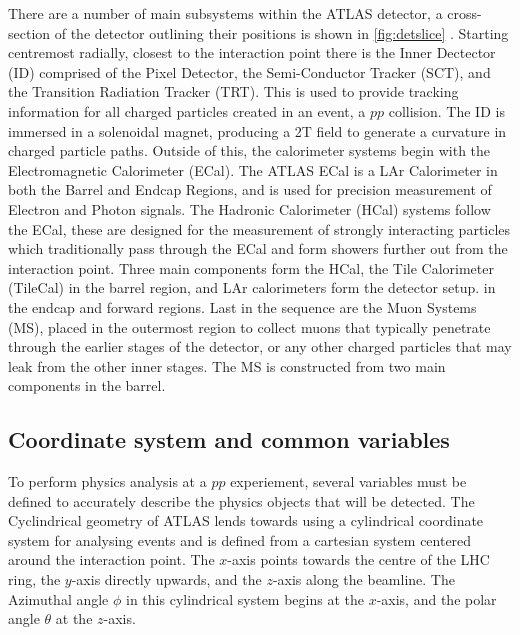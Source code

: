 There are a number of main subsystems within the ATLAS detector, a cross-section of the detector outlining their positions is shown in \ref{fig:detslice} . Starting centremost radially, closest to the interaction point there is the Inner Dectector (ID) comprised of the Pixel Detector, the Semi-Conductor Tracker (SCT), and the Transition Radiation Tracker (TRT). This is used to provide tracking information for all charged particles created in an event, a $pp$ collision. The ID is immersed in a solenoidal magnet, producing a 2T field to generate a curvature in charged particle paths. Outside of this, the calorimeter systems begin with the Electromagnetic Calorimeter (ECal). The ATLAS ECal is a LAr Calorimeter in both the Barrel and Endcap Regions, and is used for precision measurement of Electron and Photon signals. The Hadronic Calorimeter (HCal) systems follow the ECal, these are designed for the measurement of strongly interacting particles which traditionally pass through the ECal and form showers further out from the interaction point. Three main components form the HCal, the Tile Calorimeter (TileCal) in the barrel region, and LAr calorimeters form the detector setup. in the endcap and forward regions. Last in the sequence are the Muon Systems (MS), placed in the outermost region to collect muons that typically penetrate through the earlier stages of the detector, or any other charged particles that may leak from the other inner stages. The MS is constructed from two main components in the barrel.






\subsection{Coordinate system and common variables}
To perform physics analysis at a $pp$ experiement, several variables must be defined to accurately describe the physics objects that will be detected. The Cyclindrical geometry of ATLAS lends towards using a cylindrical coordinate system for analysing events and is defined from a cartesian system centered around the interaction point. The $x$-axis points towards the centre of the LHC ring, the $y$-axis directly upwards, and the $z$-axis along the beamline. The Azimuthal angle $\phi$ in this cylindrical system begins at the $x$-axis, and the polar angle $\theta$ at the $z$-axis.

